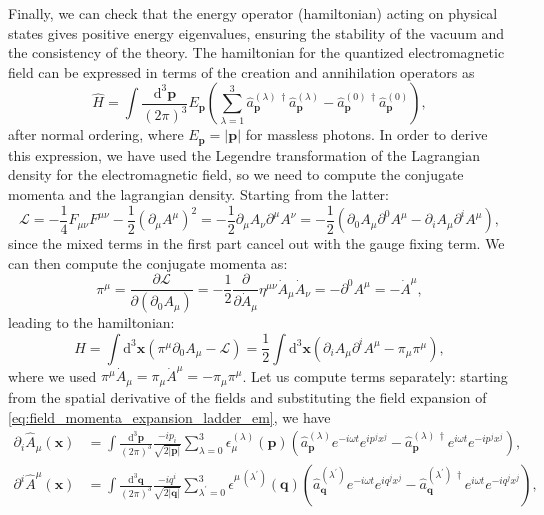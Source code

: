 Finally, we can check that the energy operator (hamiltonian) acting on physical states gives positive energy eigenvalues, ensuring the stability of the vacuum and the consistency of the theory. The hamiltonian for the quantized electromagnetic field can be expressed in terms of the creation and annihilation operators as
\begin{equation}
    \hat{H} = \int \frac{\mathrm{d}^3 \mathbf{p}}{(2\pi)^3} E_{\mathbf{p}} \left( \sum_{\lambda = 1}^3  \hat{a}^{(\lambda)\,\dagger}_{\mathbf{p}}  \hat{a}^{(\lambda)}_{\mathbf{p}} - \hat{a}^{(0)\,\dagger}_{\mathbf{p}}\hat{a}^{(0)}_{\mathbf{p}} \right),
    \label{eq:hamiltonian_em_field}
\end{equation}
after normal ordering, where \(E_{\mathbf{p}} = |\mathbf{p}|\) for massless photons. In order to derive this expression, we have used the Legendre transformation of the Lagrangian density for the electromagnetic field, so we need to compute the conjugate momenta and the lagrangian density. Starting from the latter:
\[
    \mathcal{L} = - \frac{1}{4} F_{\mu \nu} F^{\mu \nu} - \frac{1}{2} (\partial_\mu A^{\mu})^2 = - \frac{1}{2} \partial_{\mu} A_{\nu} \partial^{\mu} A^{\nu} = - \frac{1}{2} \left( \partial_0 A_{\mu} \partial^0 A^{\mu} - \partial_i A_{\mu} \partial^i A^{\mu} \right),
\]
since the mixed terms in the first part cancel out with the gauge fixing term. We can then compute the conjugate momenta as:
\[
    \pi^{\mu} = \frac{\partial \mathcal{L}}{\partial (\partial_0 A_{\mu})} = -\frac{1}{2} \frac{\partial}{\partial \dot{A}_{\mu}} \eta^{\mu \nu} \dot{A}_{\mu} \dot{A}_{\nu} = - \partial^0 A^{\mu} = - \dot{A}^{\mu},
\]
leading to the hamiltonian:
\[
    H = \int \mathrm{d}^3 \mathbf{x} \left( \pi^{\mu} \partial_0 A_{\mu} - \mathcal{L} \right) = \frac{1}{2} \int \mathrm{d}^3 \mathbf{x} \left( \partial_i A_{\mu} \partial^i A^{\mu} - \pi_\mu \pi^{\mu} \right),
\]
where we used \(\pi^{\mu}\dot{A}_\mu = \pi_{\mu}\dot{A}^\mu = - \pi_{\mu}\pi^{\mu}\). Let us compute terms separately: starting from the spatial derivative of the fields and substituting the field expansion of \eqref{eq:field_momenta_expansion_ladder_em}, we have
\[
    \begin{aligned}
        \partial_i \hat{A}_{\mu}(\mathbf{x}) & = \int \frac{\mathrm{d}^3 \mathbf{p}}{(2\pi)^3} \frac{-i p_i}{\sqrt{2 \vert \mathbf{p} \vert}} \sum_{\lambda=0}^{3} \epsilon_{\mu}^{(\lambda)}(\mathbf{p}) \left( \hat{a}^{(\lambda)}_{\mathbf{p}} e^{-i\omega t} e^{i p^j x^j} - \hat{a}^{(\lambda)\,\dagger}_{\mathbf{p}} e^{i\omega t} e^{-i p^j x^j} \right),                                    \\
        \partial^i \hat{A}^{\mu}(\mathbf{x}) & = \int \frac{\mathrm{d}^3 \mathbf{q}}{(2\pi)^3} \frac{-i q^i}{\sqrt{2 \vert \mathbf{q} \vert}} \sum_{\lambda^{\prime}=0}^{3} \epsilon^{\mu\,(\lambda^{\prime})}(\mathbf{q}) \left( \hat{a}^{(\lambda^{\prime})}_{\mathbf{q}} e^{-i\omega t} e^{i q^j x^j} - \hat{a}^{(\lambda^{\prime})\,\dagger}_{\mathbf{q}} e^{i\omega t} e^{-i q^j x^j} \right), \\
    \end{aligned}
\]
